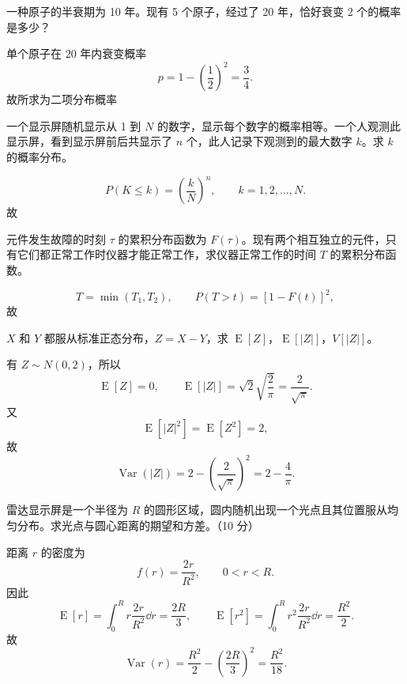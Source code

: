 \begin{question}
一种原子的半衰期为 10 年。现有 5 个原子，经过了 20 年，恰好衰变 2 个的概率是多少？
\begin{solution}
单个原子在 $20$ 年内衰变概率
\[
p=1-\left(\frac12\right)^2=\frac34.
\]
故所求为二项分布概率
\end{solution}
\end{question}

\begin{question}
一个显示屏随机显示从 1 到 $N$ 的数字，显示每个数字的概率相等。一个人观测此显示屏，看到显示屏前后共显示了 $n$ 个，此人记录下观测到的最大数字 $k$。求 $k$ 的概率分布。
\begin{solution}
\[
P(K\le k)=\left(\frac{k}{N}\right)^n,\qquad k=1,2,\dots,N.
\]
故
\end{solution}
\end{question}

\begin{question}
元件发生故障的时刻 $\tau$ 的累积分布函数为 $F(\tau)$。现有两个相互独立的元件，只有它们都正常工作时仪器才能正常工作，求仪器正常工作的时间 $T$ 的累积分布函数。
\begin{solution}
\[
T=\min(T_1,T_2),\qquad
P(T>t)=[1-F(t)]^2,
\]
故

\end{solution}
\end{question}

\begin{question}
$X$ 和 $Y$ 都服从标准正态分布，$Z=X-Y$，求 $\operatorname{E}[Z]$，$\operatorname{E}[|Z|]$，$V[|Z|]$。
\begin{solution}
有 $Z\sim N(0,2)$，所以
\[
\operatorname{E}[Z]=0,
\qquad \operatorname{E}[|Z|]=\sqrt2\sqrt{\frac{2}{\pi}}=\frac{2}{\sqrt\pi}.
\]
又
\[
\operatorname{E}[|Z|^2]=\operatorname{E}[Z^2]=2,
\]
故
\[
\operatorname{Var}(|Z|)=2-\left(\frac{2}{\sqrt\pi}\right)^2=2-\frac{4}{\pi}.
\]
\end{solution}
\end{question}

\begin{question}
雷达显示屏是一个半径为 $R$ 的圆形区域，圆内随机出现一个光点且其位置服从均匀分布。求光点与圆心距离的期望和方差。（10 分）
\begin{solution}
距离 $r$ 的密度为
\[
f(r)=\frac{2r}{R^2},\qquad 0<r<R.
\]
因此
\[
\operatorname{E}[r]=\int_0^R r\frac{2r}{R^2}\dd{r}=\frac{2R}{3},
\qquad
\operatorname{E}[r^2]=\int_0^R r^2\frac{2r}{R^2}\dd{r}=\frac{R^2}{2}.
\]
故
\[
\operatorname{Var}(r)=\frac{R^2}{2}-\left(\frac{2R}{3}\right)^2=\frac{R^2}{18}.
\]
\end{solution}
\end{question}

